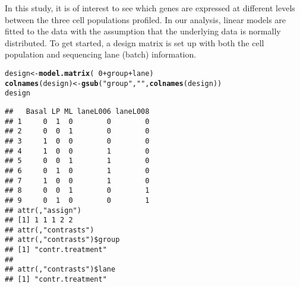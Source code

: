 \documentclass[10pt,a4paper]{extarticle}\usepackage[]{graphicx}\usepackage[]{color}
\makeatletter
\newcommand{\hlnum}[1]{\textcolor[rgb]{0.686,0.059,0.569}{#1}}%
\newcommand{\hlstr}[1]{\textcolor[rgb]{0.192,0.494,0.8}{#1}}%
\newcommand{\hlopt}[1]{\textcolor[rgb]{0,0,0}{#1}}%
\newcommand{\hlstd}[1]{\textcolor[rgb]{0.345,0.345,0.345}{#1}}%
\newcommand{\hlkwb}[1]{\textcolor[rgb]{0.69,0.353,0.396}{#1}}%
\newcommand{\hlkwd}[1]{\textcolor[rgb]{0.737,0.353,0.396}{\textbf{#1}}}%
\newenvironment{kframe}{%
 \def\at@end@of@kframe{}%
 \ifinner\ifhmode%
  \def\at@end@of@kframe{\end{minipage}}%
  \begin{minipage}{\columnwidth}%
 \fi\fi%
 \def\FrameCommand##1{\hskip\@totalleftmargin \hskip-\fboxsep
 \colorbox{shadecolor}{##1}\hskip-\fboxsep
     \hskip-\linewidth \hskip-\@totalleftmargin \hskip\columnwidth}%
 \MakeFramed {\advance\hsize-\width
   \@totalleftmargin\z@ \linewidth\hsize
   \@setminipage}}%
 {\par\unskip\endMakeFramed%
 \at@end@of@kframe}
\newenvironment{knitrout}{}{} %
\makeatother
\begin{document}
In this study, it is of interest to see which genes are expressed at different levels between the three cell populations profiled. In our analysis, linear models are fitted to the data with the assumption that the underlying data is normally distributed. To get started, a design matrix is set up with both the cell population and sequencing lane (batch) information.
\begin{knitrout}
\color{fgcolor}\begin{kframe}
\begin{alltt}
\hlstd{design} \hlkwb{<-} \hlkwd{model.matrix}\hlstd{(}\hlopt{~}\hlnum{0}\hlopt{+}\hlstd{group}\hlopt{+}\hlstd{lane)}
\hlkwd{colnames}\hlstd{(design)} \hlkwb{<-} \hlkwd{gsub}\hlstd{(}\hlstr{"group"}\hlstd{,} \hlstr{""}\hlstd{,} \hlkwd{colnames}\hlstd{(design))}
\hlstd{design}
\end{alltt}
\begin{verbatim}
##   Basal LP ML laneL006 laneL008
## 1     0  1  0        0        0
## 2     0  0  1        0        0
## 3     1  0  0        0        0
## 4     1  0  0        1        0
## 5     0  0  1        1        0
## 6     0  1  0        1        0
## 7     1  0  0        1        0
## 8     0  0  1        0        1
## 9     0  1  0        0        1
## attr(,"assign")
## [1] 1 1 1 2 2
## attr(,"contrasts")
## attr(,"contrasts")$group
## [1] "contr.treatment"
## 
## attr(,"contrasts")$lane
## [1] "contr.treatment"
\end{verbatim}
\end{kframe}
\end{knitrout}
\end{document}
